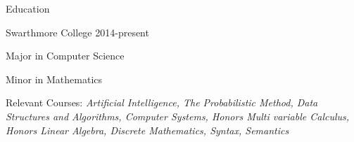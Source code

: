 \documentclass[12pt]{resume} %
\begin{document}

\begin{rSection}{Education}
    \begin{rSubsection}{Swarthmore College }{2014-present}{}{}
        \item Major in Computer Science
        \item Minor in Mathematics
        \item Relevant Courses:
            {\em
                Artificial Intelligence,
                The Probabilistic Method,
                Data Structures and Algorithms,
                Computer Systems,
                Honors Multi variable Calculus,
                Honors Linear Algebra,
                Discrete Mathematics,
                Syntax,
                Semantics
            }
    \end{rSubsection}
\end{rSection}

\end{document}
